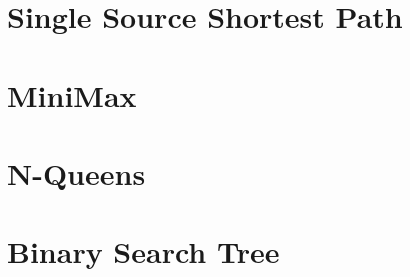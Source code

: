 \section{Single Source Shortest Path}\label{appendix:proofs:sssp}

\section{MiniMax}\label{appendix:proofs:minimax}

\section{N-Queens}\label{appendix:proofs:nqueens}

\section{Binary Search Tree}\label{appendix:proofs:bst}


